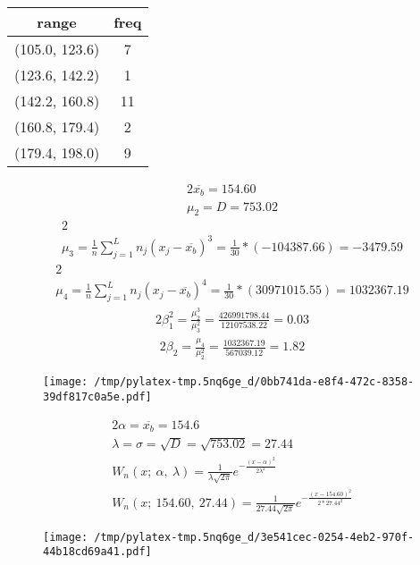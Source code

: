 \documentclass{article}%
\begin{document}
%
\normalsize%
\begin{tabular}{c|c}
\toprule
         range &  freq \\
\midrule
(105.0, 123.6) &     7 \\
(123.6, 142.2) &     1 \\
(142.2, 160.8) &    11 \\
(160.8, 179.4) &     2 \\
(179.4, 198.0) &     9 \\
\bottomrule
\end{tabular}
%
\begin{alignat*}{2}%
\overline {{ x_{{b}} }} = 154.60%
\\ \mu_2 = D = 753.02%
\end{alignat*}%
\begin{alignat*}{2}%
\\ \mu_3
            = \frac 1 n \sum\limits_{j = 1}^L {n_j (x_j - \overline {{ x_{{b}} }})^3}
            = \frac 1 { 30 } * (-104387.66)
            = -3479.59
\end{alignat*}%
\begin{alignat*}{2}%
\\ \mu_4
            = \frac 1 n \sum\limits_{j = 1}^L {n_j (x_j - \overline {{ x_{{b}} }})^4}
            = \frac 1 { 30 } * (30971015.55)
            = 1032367.19
\end{alignat*}%
\begin{alignat*}{2}%
\beta_1^2
            = \frac {\mu_2^3} {\mu_3^2}
            = \frac {426991798.44} {12107538.22}
            = 0.03
\end{alignat*}%
\begin{alignat*}{2}%
\beta_2
            = \frac {\mu_4} {\mu_2^2}
            = \frac {1032367.19} {567039.12}
            = 1.82
\end{alignat*}%


\begin{figure}[H]%
\centering%
\texttt{[image: /tmp/pylatex-tmp.5nq6ge\_d/0bb741da-e8f4-472c-8358-39df817c0a5e.pdf]}%
\end{figure}

%
\begin{alignat*}{2}%
\alpha = \overline {{ x_{{b}} }} = 154.6%
\\ \lambda
            = \sigma
            = \sqrt D
            = \sqrt {753.02}
            = 27.44
\\ W_n(x; ~ \alpha, ~ \lambda)
            = \frac 1 {{\lambda \sqrt {{2 \pi}} }}
                e^{{ - \frac {{(x - \alpha)^2}} {{2 \lambda^2}} }}%
\\ W_n(x; ~154.60, ~ 27.44)
            = \frac 1 { 27.44 \sqrt {2 \pi} }
                e^{ - \frac {(x - 154.60)^2} {2 * 27.44^2} }%
\end{alignat*}%


\begin{figure}[H]%
\centering%
\texttt{[image: /tmp/pylatex-tmp.5nq6ge\_d/3e541cec-0254-4eb2-970f-44b18cd69a41.pdf]}%
\end{figure}

%
\end{document}
